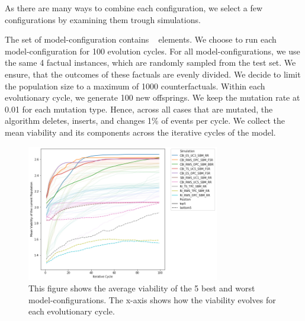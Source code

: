 \documentclass[./../../paper.tex]{subfiles}
\begin{document}
\label{sec:exp1}
As there are many ways to combine each configuration, we select a few configurations by examining them trough simulations.  



The set of model-configuration contains \NumEvoCombinations ~ elements. 
We choose to run each model-configuration for 100 evolution cycles. 
For all model-configurations, we use the same 4 factual \glspl{instance}, which are randomly sampled from the test set. We ensure, that the outcomes of these factuals are evenly divided. 
We decide to limit the population size to a maximum of 1000 counterfactuals. Within each evolutionary cycle, we generate 100 new offsprings. We keep the mutation rate at 0.01 for each mutation type. Hence, across all cases that are mutated, the algorithm deletes, inserts, and changes 1\% of events per cycle. We collect the mean viability and its components across the iterative cycles of the model.



\begin{figure}[htbp]
    \centering
    \includegraphics[width=0.75\textwidth]{figures/generated/exp1_effect_on_viability_top10_last10.png}
    \caption{This figure shows the average viability of the 5 best and worst model-configurations. The x-axis shows how the viability evolves for each evolutionary cycle.}
    \label{fig:average-viability}
\end{figure}
\end{document}
